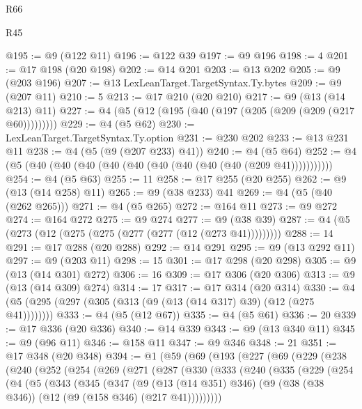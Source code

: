 \begin{lexlean}{R66}
\begin{lexlean}{R45}
\begin{coremodule}
{{{{{{{{{{{{{{{{{{{{{{{{{{{{{{{{{{{{{{{{{{{{{{{{{{{{{{{{{{{{{{{{{{{{{{{{{{{{{{{{{{{{{{{{{{{@195 := @9 (@122 @11)
@196 := @122 @39
@197 := @9 @196
@198 := 4
@201 := @17 @198 (@20 @198)
@202 := @14 @201
@203 := @13 @202
@205 := @9 (@203 @196)
@207 := @13 LexLeanTarget.TargetSyntax.Ty.bytes
@209 := @9 (@207 @11)
@210 := 5
@213 := @17 @210 (@20 @210)
@217 := @9 (@13 (@14 @213) @11)
@227 := @4 (@5 (@12 (@195 (@40 (@197 (@205 (@209 (@209 (@217 @60)))))))))
@229 := @4 (@5 @62)
@230 := LexLeanTarget.TargetSyntax.Ty.option
@231 := @230 @202
@233 := @13 @231 @11
@238 := @4 (@5 (@9 (@207 @233) @41))
@240 := @4 (@5 @64)
@252 := @4 (@5 (@40 (@40 (@40 (@40 (@40 (@40 (@40 (@40 (@40 (@209 @41)))))))))))
@254 := @4 (@5 @63)
@255 := 11
@258 := @17 @255 (@20 @255)
@262 := @9 (@13 (@14 @258) @11)
@265 := @9 (@38 @233) @41
@269 := @4 (@5 (@40 (@262 @265)))
@271 := @4 (@5 @265)
@272 := @164 @11
@273 := @9 @272
@274 := @164 @272
@275 := @9 @274
@277 := @9 (@38 @39)
@287 := @4 (@5 (@273 (@12 (@275 (@275 (@277 (@277 (@12 (@273 @41)))))))))
@288 := 14
@291 := @17 @288 (@20 @288)
@292 := @14 @291
@295 := @9 (@13 @292 @11)
@297 := @9 (@203 @11)
@298 := 15
@301 := @17 @298 (@20 @298)
@305 := @9 (@13 (@14 @301) @272)
@306 := 16
@309 := @17 @306 (@20 @306)
@313 := @9 (@13 (@14 @309) @274)
@314 := 17
@317 := @17 @314 (@20 @314)
@330 := @4 (@5 (@295 (@297 (@305 (@313 (@9 (@13 (@14 @317) @39) (@12 (@275 @41))))))))
@333 := @4 (@5 (@12 @67))
@335 := @4 (@5 @61)
@336 := 20
@339 := @17 @336 (@20 @336)
@340 := @14 @339
@343 := @9 (@13 @340 @11)
@345 := @9 (@96 @11)
@346 := @158 @11
@347 := @9 @346
@348 := 21
@351 := @17 @348 (@20 @348)
@394 := @1
    (@59
      (@69
        (@193
          (@227
            (@69
              (@229
                (@238
                  (@240
                    (@252
                      (@254
                        (@269
                          (@271
                            (@287
                              (@330
                                (@333
                                  (@240
                                    (@335
                                      (@229
                                        (@254
                                          (@4
                                            (@5
                                              (@343
                                                (@345
                                                  (@347
                                                    (@9
                                                      (@13 (@14 @351) @346)
                                                      (@9
                                                        (@38 (@38 @346))
                                                        (@12 (@9 (@158 @346) (@217 @41)))))))))
}}}}}}}}}}}}}}}}}}}}}}}}}}}}}}}}}}}}}}}}}}}}}}}}}}}}}}}}}}}}}}}}}}}}}}}}}}}}}}}}}}}}}}}}}}}
\end{coremodule}
\end{lexlean}
\end{lexlean}
